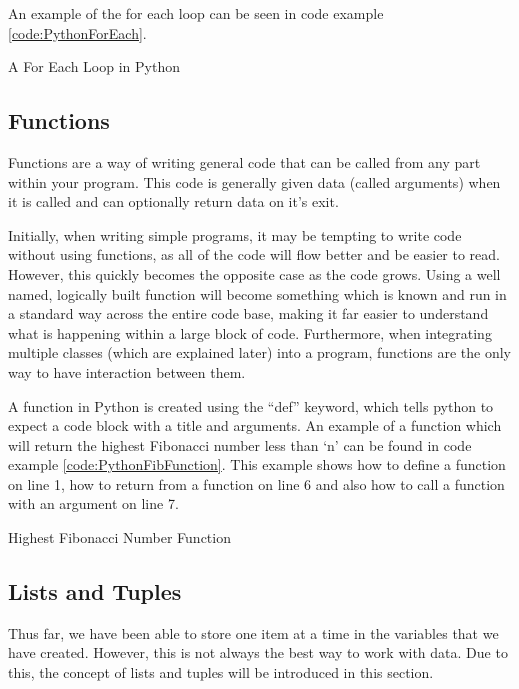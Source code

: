 				An example of the for each loop can be seen in code example \ref{code:PythonForEach}.
				\begin{code}
					\caption{A For Each Loop in Python}
					\label{code:PythonForEach}
				\end{code}
		\subsection{Functions}
			Functions are a way of writing general code that can be called from any part within your program.
			This code is generally given data (called arguments) when it is called and can optionally return data on it's exit.

			Initially, when writing simple programs, it may be tempting to write code without using functions, as all of the code will flow better and be easier to read.
			However, this quickly becomes the opposite case as the code grows.
			Using a well named, logically built function will become something which is known and run in a standard way across the entire code base, making it far easier to understand what is happening within a large block of code.
			Furthermore, when integrating multiple classes (which are explained later) into a program, functions are the only way to have interaction between them.

			A function in Python is created using the ``def'' keyword, which tells python to expect a code block with a title and arguments.
			An example of a function which will return the highest Fibonacci number less than `n' can be found in code example \ref{code:PythonFibFunction}.
			This example shows how to define a function on line 1, how to return from a function on line 6 and also how to call a function with an argument on line 7.

			\begin{code}
				\pcode{./PythonFibFunction.py}
				\caption{Highest Fibonacci Number Function}
				\label{code:PythonFibFunction}
			\end{code}
		\subsection{Lists and Tuples}
			Thus far, we have been able to store one item at a time in the variables that we have created.
			However, this is not always the best way to work with data.
			Due to this, the concept of lists and tuples will be introduced in this section.
